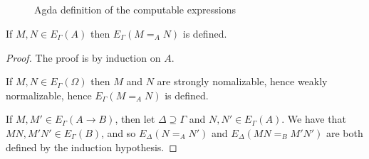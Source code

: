 \begin{figure}
\begin{code}
\>[4] \AgdaSymbol{:}     \<%
\\
\>[2]\<[4]%
\>[4] \AgdaSymbol{:}    \<%
\\
%
\\
\> \AgdaSymbol{:}  \AgdaSymbol{\{}\AgdaSymbol{\}} \AgdaSymbol{(} \AgdaSymbol{:}  \AgdaSymbol{)} \AgdaSymbol{\{}\AgdaSymbol{\}}        \AgdaSymbol{(} \AgdaSymbol{)}   \<%
\\
\> \AgdaSymbol{\{}\AgdaSymbol{\}}  \AgdaSymbol{\{}\AgdaSymbol{\}}   \AgdaSymbol{=}   \AgdaSymbol{\{}\AgdaSymbol{\}}   \AgdaSymbol{\{(}  \AgdaSymbol{)}    \AgdaSymbol{(} \AgdaSymbol{)} \AgdaSymbol{\})}  \AgdaSymbol{(}  \AgdaSymbol{)}\<%
\end{code}
\caption{Agda definition of the computable expressions}
\label{fig:compute}
\end{figure}

\begin{lemma}
If $M, N \in E_\Gamma(A)$ then $E_\Gamma(M =_A N)$ is defined.
\end{lemma}

\begin{proof}
The proof is by induction on $A$.

If $M, N \in E_\Gamma(\Omega)$ then $M$ and $N$ are strongly nomalizable, hence weakly normalizable, hence $E_\Gamma(M =_A N)$ is defined.

If $M, M' \in E_\Gamma(A \rightarrow B)$, then let $\Delta \supseteq \Gamma$ and $N, N' \in E_\Gamma(A)$.  We have that $MN, M'N' \in E_\Gamma(B)$,
and so $E_\Delta(N =_A N')$ and $E_\Delta(MN =_B M'N')$ are both defined by the induction hypothesis.
\end{proof}

